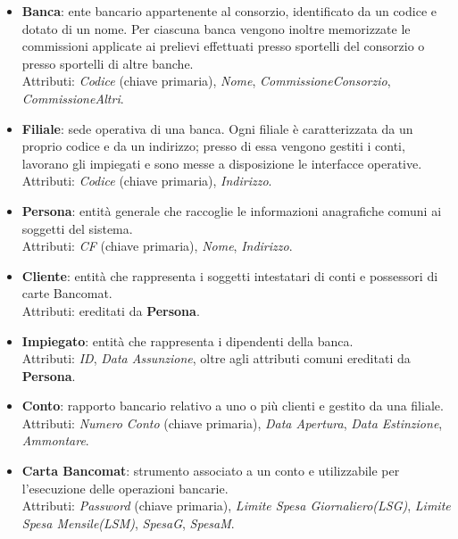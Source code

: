 \begin{itemize}
  \item \textbf{Banca}: ente bancario appartenente al consorzio, identificato da un codice e dotato di un nome. Per ciascuna banca vengono inoltre memorizzate le commissioni applicate ai prelievi effettuati presso sportelli del consorzio o presso sportelli di altre banche.\\
  Attributi: \textit{Codice} (chiave primaria), \textit{Nome}, \textit{CommissioneConsorzio}, \textit{CommissioneAltri}.

  \item \textbf{Filiale}: sede operativa di una banca. Ogni filiale è caratterizzata da un proprio codice e da un indirizzo; presso di essa vengono gestiti i conti, lavorano gli impiegati e sono messe a disposizione le interfacce operative.\\
  Attributi: \textit{Codice} (chiave primaria), \textit{Indirizzo}.

  \item \textbf{Persona}: entità generale che raccoglie le informazioni anagrafiche comuni ai soggetti del sistema.\\
  Attributi: \textit{CF} (chiave primaria), \textit{Nome}, \textit{Indirizzo}.

  \item \textbf{Cliente}: entità che rappresenta i soggetti intestatari di conti e possessori di carte Bancomat.\\
  Attributi: ereditati da \textbf{Persona}.

  \item \textbf{Impiegato}: entità che rappresenta i dipendenti della banca.\\
  Attributi: \textit{ID}, \textit{Data Assunzione}, oltre agli attributi comuni ereditati da \textbf{Persona}.

  \item \textbf{Conto}: rapporto bancario relativo a uno o più clienti e gestito da una filiale.\\
  Attributi: \textit{Numero Conto} (chiave primaria), \textit{Data Apertura}, \textit{Data Estinzione}, \textit{Ammontare}.

  \item \textbf{Carta Bancomat}: strumento associato a un conto e utilizzabile per l'esecuzione delle operazioni bancarie.\\
  Attributi: \textit{Password} (chiave primaria), \textit{Limite Spesa Giornaliero(LSG)}, \textit{Limite Spesa Mensile(LSM)}, \textit{SpesaG}, \textit{SpesaM}.


\end{itemize}
